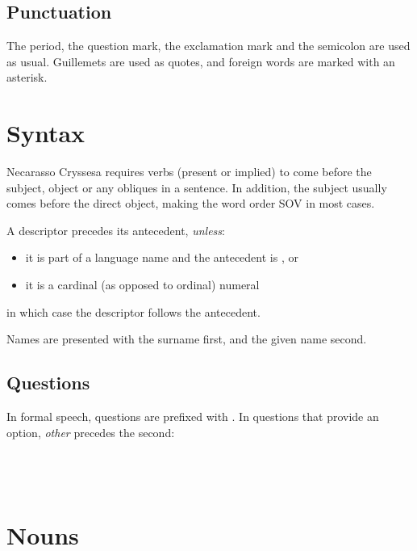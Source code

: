 \documentclass{book}
\begin{document}
\section{Punctuation}

The period, the question mark, the exclamation mark and the semicolon are used as usual. Guillemets are used as quotes, and foreign words are marked with an asterisk.

\chapter{Syntax}

Necarasso Cryssesa requires verbs (present or implied) to come before the subject, object or any obliques in a sentence. In addition, the subject usually comes before the direct object, making the word order SOV in most cases.

A descriptor precedes its antecedent, \emph{unless}:

\begin{itemize}
  \item it is part of a language name and the antecedent is , or
  \item it is a cardinal (as opposed to ordinal) numeral
\end{itemize}

in which case the descriptor follows the antecedent.

Names are presented with the surname first, and the given name second.

\section{Questions}

In formal speech, questions are prefixed with . In questions that provide an option,  \emph{other} precedes the second: \\
~\\
       \\
       \\
     

\chapter{Nouns}
\end{document}
